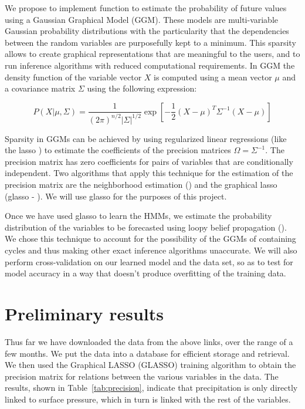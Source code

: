 \documentclass{article}
\begin{document}
We propose to implement function to estimate the probability
of future values using a Gaussian Graphical Model (GGM). These models are
multi-variable Gaussian probability distributions with the particularity that
the dependencies between the random variables are purposefully kept to a
minimum. This sparsity allows to create graphical representations that
are meaningful to the users, and to run inference algorithms with reduced
computational requirements. In GGM the density function of the variable vector
$X$ is computed using a mean vector $\mu$ and a covariance matrix $\Sigma$
using the following expression:

\begin{equation}
\label{eq:gaussian}
P(X|\mu,\Sigma) =
\frac{1}{(2\pi)^{n/2}\vert\Sigma\vert^{1/2}}\exp[-\frac{1}{2}(X - \mu)^T\Sigma^{-1}(X - \mu)]
\end{equation}

Sparsity in GGMs can be achieved by using regularized linear regressions (like
the lasso \cite{tibshirani1996}) to estimate the coefficients of the precision
matrices $\Omega=\Sigma^{-1}$. The precision matrix has zero coefficients for
pairs of variables that are conditionally independent. Two algorithms that apply
this technique for the estimation of the precision matrix are the
neighborhood estimation (\cite{meinshausen2006}) and the graphical lasso
(glasso - \cite{friedman2008}). We will use glasso for the purposes of this
project.

Once we have used glasso to learn the HMMs, we estimate the probability
distribution of the variables to be forecasted using loopy belief
propagation (\cite{murphy1999}). We chose this technique to account for the
possibility of the GGMs of containing cycles and thus making other exact
inference algorithms unaccurate. We will also perform cross-validation on our
learned model and the data set, so as to test for model accuracy in a way that
doesn't produce overfitting of the training data.

\section{Preliminary results}

Thus far we have downloaded the data from the above links, over the range of a
few months. We put the data into a database for efficient storage and retrieval.
We then used the Graphical LASSO (GLASSO) training algorithm to obtain the
precision matrix for relations between the various variables in the data. The
results, shown in Table~\ref{tab:precision}, indicate that precipitation is only
directly linked to surface pressure, which in turn is linked with the rest of
the variables.
\end{document}
